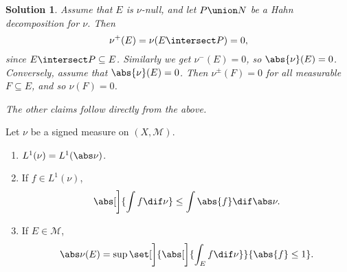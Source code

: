 \documentclass[article, a4paper, 11pt, oneside]{memoir}
\numberwithin{equation}{chapter}
\newcommand{\calM}{\mathcal{M}}
\theoremstyle{nonumberplain}
\newtheorem{solution}{Solution}
\begin{document}
\begin{solution}
	Assume that $E$ is $\nu$-null, and let $P \union N$ be a Hahn decomposition for $\nu$. Then
	\begin{equation*}
		\nu^+(E) = \nu(E \intersect P) = 0,
	\end{equation*}
	since $E \intersect P \subseteq E$. Similarly we get $\nu^-(E) = 0$, so $\abs{\nu}(E) = 0$. Conversely, assume that $\abs{\nu}(E) = 0$. Then $\nu^\pm(F) = 0$ for all measurable $F \subseteq E$, and so $\nu(F) = 0$.

	The other claims follow directly from the above.
\end{solution}


\begin{exerciseframed*}[3]
	Let $\nu$ be a signed measure on $(X,\calM)$.
	\begin{enumerate}
		\item $L^1(\nu) = L^1(\abs\nu)$.
		\item If $f \in L^1(\nu)$,
		\begin{equation*}
			\abs[\bigg]{ \int f \dif\nu }
				\leq \int \abs{f} \dif\abs\nu.
		\end{equation*}
		
		\item If $E \in \calM$,
		\begin{equation*}
			\abs\nu(E)
				= \sup\set[\bigg]{ \abs[\bigg]{\int_E f \dif\nu} }{ \abs{f} \leq 1 }.
		\end{equation*}
	\end{enumerate}
\end{exerciseframed*}
\end{document}
